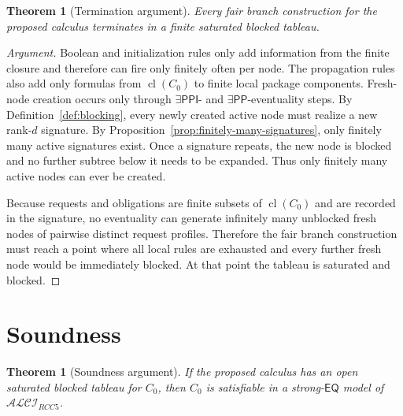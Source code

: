 \documentclass[11pt]{article}
\newtheorem{theorem}[definition]{Theorem}
\theoremstyle{remark}
\newcommand{\PP}{\mathsf{PP}}
\newcommand{\PPI}{\mathsf{PPI}}
\newcommand{\EQ}{\mathsf{EQ}}
\newcommand{\cl}{\operatorname{cl}}
\begin{document}
\begin{theorem}[Termination argument]\label{thm:termination}
Every fair branch construction for the proposed calculus terminates in a finite saturated blocked tableau.
\end{theorem}

\begin{proof}[Argument]
Boolean and initialization rules only add information from the finite closure and therefore can fire only finitely often per node. The propagation rules also add only formulas from $\cl(C_0)$ to finite local package components. Fresh-node creation occurs only through $\exists\PPI$- and $\exists\PP$-eventuality steps. By Definition~\ref{def:blocking}, every newly created active node must realize a new rank-$d$ signature. By Proposition~\ref{prop:finitely-many-signatures}, only finitely many active signatures exist. Once a signature repeats, the new node is blocked and no further subtree below it needs to be expanded. Thus only finitely many active nodes can ever be created.

Because requests and obligations are finite subsets of $\cl(C_0)$ and are recorded in the signature, no eventuality can generate infinitely many unblocked fresh nodes of pairwise distinct request profiles. Therefore the fair branch construction must reach a point where all local rules are exhausted and every further fresh node would be immediately blocked. At that point the tableau is saturated and blocked.
\end{proof}

\section{Soundness}

\begin{theorem}[Soundness argument]\label{thm:soundness}
If the proposed calculus has an open saturated blocked tableau for $C_0$, then $C_0$ is satisfiable in a strong-$\EQ$ model of $\mathcal{ALCI}_{RCC5}$.
\end{theorem}
\end{document}
